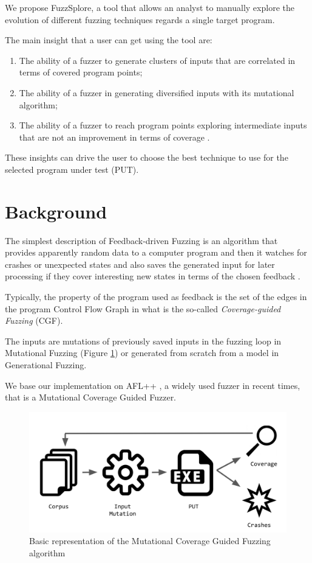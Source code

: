 \documentclass[conference,compsoc]{IEEEtran}
\begin{document}
We propose {\sc FuzzSplore}, a tool that allows an analyst to manually explore the evolution of different fuzzing techniques regards a single target program.

The main insight that a user can get using the tool are:

\begin{enumerate}
\item The ability of a fuzzer to generate clusters of inputs that are correlated in terms of covered program points;
\item The ability of a fuzzer in generating diversified inputs with its mutational algorithm;
\item The ability of a fuzzer to reach program points exploring intermediate inputs that are not an improvement in terms of coverage \cite{besensitive}.
\end{enumerate}

These insights can drive the user to choose the best technique to use for the selected program under test (PUT).

\section{Background}
\label{sec:back}

The simplest description of Feedback-driven Fuzzing is an algorithm that provides apparently random data to a computer program and then it watches for crashes or unexpected states and also saves the generated input for later processing if they cover interesting new states in terms of the chosen feedback \cite{fuzzing-book}.

Typically, the property of the program used as feedback is the set of the edges in the program Control Flow Graph \cite{compilerbook} in what is the so-called {\it Coverage-guided Fuzzing} (CGF).

The inputs are mutations of previously saved inputs in the fuzzing loop in Mutational Fuzzing (Figure \ref{fig:cfg}) or generated from scratch from a model in Generational Fuzzing.

We base our implementation on {\sc AFL++} \cite{aflplusplus}, a widely used fuzzer in recent times, that is a Mutational Coverage Guided Fuzzer.

\begin{figure}[H]
\includegraphics[scale=0.2]{img/cgf}
\centering
\caption{Basic representation of the Mutational Coverage Guided Fuzzing algorithm}
\label{fig:cfg}
\end{figure}
\end{document}
